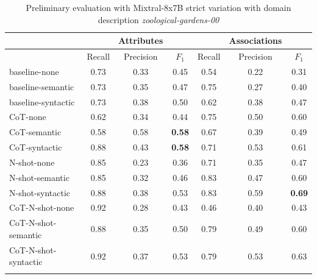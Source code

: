 \begin{table}[!h]
    \scriptsize
    \centering
    \setlength{\tabcolsep}{0.5em}
    \begin{tabular}{lcccccc}
    \toprule
         & & Attributes & & & Associations & \\
     \toprule
         & Recall & Precision & $F_1$ & Recall & Precision & $F_1$ \\
    \toprule
    
    \addlinespace
         baseline-none        & 0.73 & 0.33 & 0.45 & 0.54 & 0.22 & 0.31 \\
    	 baseline-semantic    & 0.73 & 0.35 & 0.47 & 0.75 & 0.27 & 0.40 \\
         baseline-syntactic   & 0.73 & 0.38 & 0.50 & 0.62 & 0.38 & 0.47 \\
         CoT-none             & 0.62 & 0.34 & 0.44 & 0.75 & 0.50 & 0.60 \\
         CoT-semantic         & 0.58 & 0.58 & \textbf{0.58} & 0.67 & 0.39 & 0.49 \\
         CoT-syntactic        & 0.88 & 0.43 & \textbf{0.58} & 0.71 & 0.53 & 0.61 \\
         N-shot-none          & 0.85 & 0.23 & 0.36 & 0.71 & 0.35 & 0.47 \\
         N-shot-semantic      & 0.85 & 0.32 & 0.46 & 0.83 & 0.47 & 0.60 \\
         N-shot-syntactic     & 0.88 & 0.38 & 0.53 & 0.83 & 0.59 & \textbf{0.69} \\
         CoT-N-shot-none      & 0.92 & 0.28 & 0.43 & 0.46 & 0.40 & 0.43 \\
         CoT-N-shot-semantic  & 0.88 & 0.35 & 0.50 & 0.79 & 0.49 & 0.60 \\
         CoT-N-shot-syntactic & 0.92 & 0.37 & 0.53 & 0.79 & 0.53 & 0.63 \\
    \addlinespace
    \bottomrule
    \addlinespace
    \end{tabular}
    \caption{Preliminary evaluation with Mixtral-8x7B strict variation with domain description \textit{zoological-gardens-00}}
    \label{tab:preliminary-mixtral}
\end{table}


